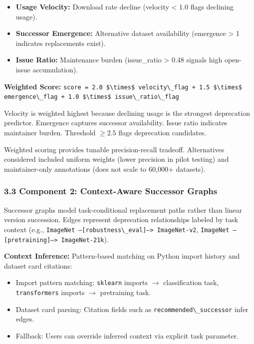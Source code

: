 \begin{itemize}
\item \textbf{Usage Velocity:} Download rate decline (velocity < 1.0 flags declining usage).
\item \textbf{Successor Emergence:} Alternative dataset availability (emergence > 1 indicates replacements exist).
\item \textbf{Issue Ratio:} Maintenance burden (issue\_ratio > 0.48 signals high open-issue accumulation).
\end{itemize}

\textbf{Weighted Score:} \texttt{score = 2.0 \$\textbackslash times\$ velocity\textbackslash \_flag + 1.5 \$\textbackslash times\$ emergence\textbackslash \_flag + 1.0 \$\textbackslash times\$ issue\textbackslash \_ratio\textbackslash \_flag}

Velocity is weighted highest because declining usage is the strongest deprecation predictor. Emergence captures successor availability. Issue ratio indicates maintainer burden. Threshold $\geq 2.5$ flags deprecation candidates.

Weighted scoring provides tunable precision-recall tradeoff. Alternatives considered included uniform weights (lower precision in pilot testing) and maintainer-only annotations (does not scale to 60,000+ datasets).

\subsubsection{3.3 Component 2: Context-Aware Successor Graphs}

Successor graphs model task-conditional replacement paths rather than linear version succession. Edges represent deprecation relationships labeled by task context (e.g., \texttt{ImageNet --[robustness\textbackslash \_eval]--> ImageNet-v2}, \texttt{ImageNet --[pretraining]--> ImageNet-21k}).

\textbf{Context Inference:} Pattern-based matching on Python import history and dataset card citations:
\begin{itemize}
\item Import pattern matching: \texttt{sklearn} imports $\rightarrow$ classification task, \texttt{transformers} imports $\rightarrow$ pretraining task.
\item Dataset card parsing: Citation fields such as \texttt{recommended\textbackslash \_successor} infer edges.
\item Fallback: Users can override inferred context via explicit task parameter.
\end{itemize}

